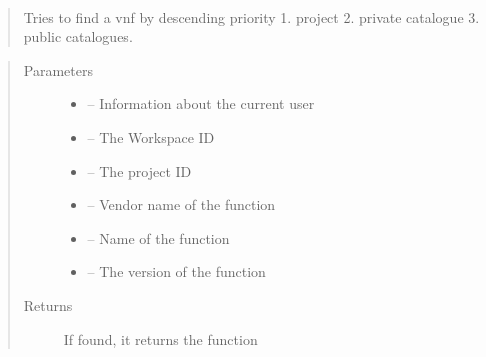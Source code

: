 \documentclass[letterpaper,10pt,english]{sphinxmanual}
\begin{document}
\begin{fulllineitems}
\label{_source/son_editor.impl:son_editor.impl.nsfslookupimpl.find_vnf}~\begin{quote}

Tries to find a vnf by descending priority
1. project
2. private catalogue
3. public catalogues.
\end{quote}
\begin{quote}\begin{description}
\item[{Parameters}] \leavevmode\begin{itemize}
\item {} 
 -- Information about the current user

\item {} 
 -- The Workspace ID

\item {} 
 -- The project ID

\item {} 
 -- Vendor name of the function

\item {} 
 -- Name of the function

\item {} 
 -- The   version of the function

\end{itemize}

\item[{Returns}] \leavevmode
If found, it returns the function

\end{description}\end{quote}

\end{fulllineitems}

\end{document}
